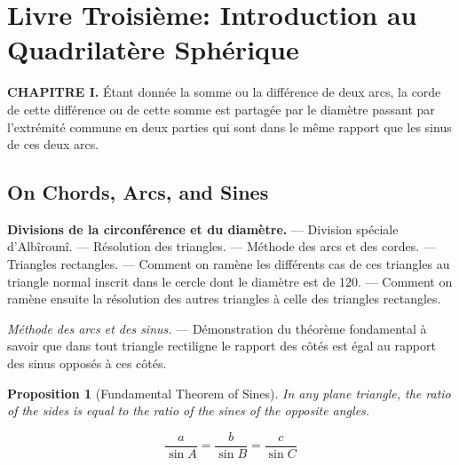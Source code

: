 \documentclass[11pt,a4paper]{article}
\theoremstyle{plain}
\newtheorem{proposition}{Proposition}[section]
\theoremstyle{definition}
\theoremstyle{remark}
\begin{document}
\section{Livre Troisième: Introduction au Quadrilatère Sphérique}

\label{sec:livre3}





\textbf{CHAPITRE I.} Étant donnée la somme ou la différence de deux arcs, la corde de cette différence ou de cette somme est partagée par le diamètre passant par l'extrémité commune en deux parties qui sont dans le même rapport que les sinus de ces deux arcs.





\subsection{On Chords, Arcs, and Sines}

\label{sec:chords-arcs}





\textbf{Divisions de la circonférence et du diamètre.} --- Division spéciale d'Albîrounî. --- Résolution des triangles. --- Méthode des arcs et des cordes. --- Triangles rectangles. --- Comment on ramène les différents cas de ces triangles au triangle normal inscrit dans le cercle dont le diamètre est de 120. --- Comment on ramène ensuite la résolution des autres triangles à celle des triangles rectangles.



\textit{Méthode des arcs et des sinus.} --- Démonstration du théorème fondamental à savoir que dans tout triangle rectiligne le rapport des côtés est égal au rapport des sinus opposés à ces côtés.





\begin{proposition}[Fundamental Theorem of Sines]

In any plane triangle, the ratio of the sides is equal to the ratio of the sines of the opposite angles.

\[

\frac{a}{\sin A} = \frac{b}{\sin B} = \frac{c}{\sin C}

\]

\end{proposition}
\end{document}
